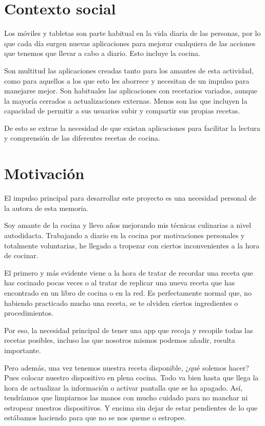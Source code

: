 \section{Contexto social}

Los móviles y tabletas son parte habitual en la vida diaria de las personas, por
lo que cada día surgen nuevas aplicaciones para mejorar cualquiera de las
acciones que tenemos que llevar a cabo a diario. Esto incluye la cocina.

Son multitud las aplicaciones creadas tanto para los amantes de esta actividad,
como para aquellos a los que esto les aborrece y necesitan de un impulso para
manejarse mejor. Son habituales las aplicaciones con recetarios variados, aunque
la mayoría cerrados a actualizaciones externas. Menos son las que incluyen la
capacidad de permitir a sus usuarios subir y compartir sus propias recetas.

De esto se extrae la necesidad de que existan aplicaciones para facilitar la
lectura y comprensión de las diferentes recetas de cocina.


\section{Motivación}
\label{sec:situacion-actual}

El impulso principal para desarrollar este proyecto es una necesidad personal
de la autora de esta memoria.

Soy amante de la cocina y llevo años mejorando mis técnicas culinarias a nivel
autodidacta. Trabajando a diario en la cocina por motivaciones personales y
totalmente voluntarias, he llegado a tropezar con ciertos inconvenientes a la
hora de cocinar.

El primero y más evidente viene a la hora de tratar de recordar una receta que
has cocinado pocas veces o al tratar de replicar una nueva receta que has
encontrado en un libro de cocina o en la red. Es perfectamente normal que, no
habiendo practicado mucho una receta, se te olviden ciertos ingredientes o
procedimientos. 

Por eso, la necesidad principal de tener una app que recoja y recopile todas
las recetas posibles, incluso las que nosotros mismos podemos añadir, resulta
importante.

Pero además, una vez tenemos nuestra receta disponible, ¿qué solemos hacer?
Pues colocar nuestro dispositivo en plena cocina. Todo va bien hasta que llega
la hora de actualizar la información o activar pantalla que se ha apagado. Así,
tendríamos que limpiarnos las manos con mucho cuidado para no manchar ni
estropear nuestros dispositivos. Y encima sin dejar de estar pendientes de lo
que estábamos haciendo para que no se nos queme o estropee.

